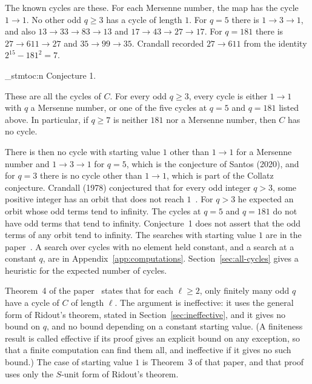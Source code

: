 \documentclass[11pt]{article}
\newenvironment{named}[1]{%
  \par\addvspace{\medskipamount}%
  \pagebreak[3]%
  \noindent{\bfseries #1}\space\ignorespaces
  \stmtoc{#1}%
}{\par\addvspace{\medskipamount}}
\newcommand{\stmtoc}[1]{ \qn_stmtoc:n {#1} }
\newcounter{stmtref}
\newcommand{\markstmt}[2]{%
  \setcounter{stmtref}{#1}%
  \addtocounter{stmtref}{-1}%
  \refstepcounter{stmtref}%
  \label{#2}%
}
\begin{document}
The known cycles are these.
For each Mersenne number, the map has the cycle $1 \to 1$.
No other odd $q \ge 3$ has a cycle of length $1$.
For $q = 5$ there is $1 \to 3 \to 1$, and also $13 \to 33 \to 83 \to 13$ and $17 \to 43 \to 27 \to 17$.
For $q = 181$ there is $27 \to 611 \to 27$ and $35 \to 99 \to 35$.
Crandall recorded $27 \to 611$ from the identity $2^{15} - 181^2 = 7$.

\begin{named}{Conjecture 1.}
\markstmt{1}{conj:all}
These are all the cycles of $C$.
For every odd $q \ge 3$, every cycle is either $1 \to 1$ with $q$ a Mersenne number, or one of the five cycles at $q = 5$ and $q = 181$ listed above.
In particular, if $q \ge 7$ is neither $181$ nor a Mersenne number, then $C$ has no cycle.
\end{named}

There is then no cycle with starting value $1$ other than $1 \to 1$ for a Mersenne number and $1 \to 3 \to 1$ for $q = 5$, which is the conjecture of Santos (2020), and for $q = 3$ there is no cycle other than $1 \to 1$, which is part of the Collatz conjecture.
Crandall (1978) conjectured that for every odd integer $q > 3$, some positive integer has an orbit that does not reach $1$~\cite{crandall}.
For $q > 3$ he expected an orbit whose odd terms tend to infinity.
The cycles at $q = 5$ and $q = 181$ do not have odd terms that tend to infinity.
Conjecture~1 does not assert that the odd terms of any orbit tend to infinity.
The searches with starting value $1$ are in the paper~\cite{hackman-i}.
A search over cycles with no element held constant, and a search at a constant $q$, are in Appendix~\ref{app:computations}.
Section~\ref{sec:all-cycles} gives a heuristic for the expected number of cycles.

Theorem~4 of the paper~\cite{hackman-i} states that for each $\ell \ge 2$, only finitely many odd $q$ have a cycle of $C$ of length $\ell$.
The argument is ineffective: it uses the general form of Ridout's theorem, stated in Section~\ref{sec:ineffective}, and it gives no bound on $q$, and no bound depending on a constant starting value.
(A finiteness result is called effective if its proof gives an explicit bound on any exception, so that a finite computation can find them all, and ineffective if it gives no such bound.)
The case of starting value $1$ is Theorem~3 of that paper, and that proof uses only the $S$-unit form of Ridout's theorem.
\end{document}

